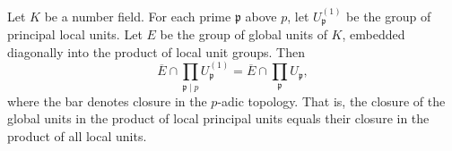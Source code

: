 Let $K$ be a number field. For each prime $\mathfrak{p}$ above $p$, let $U_{\mathfrak{p}}^{(1)}$ be the group of principal local units. Let $E$ be the group of global units of $K$, embedded diagonally into the product of local unit groups. Then
$$\overline{E} \cap \prod_{\mathfrak{p} \mid p} U_{\mathfrak{p}}^{(1)} = \overline{E} \cap \prod_{\mathfrak{p}} U_{\mathfrak{p}},$$
where the bar denotes closure in the $p$-adic topology. That is, the closure of the global units in the product of local principal units equals their closure in the product of all local units.

